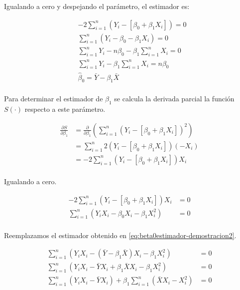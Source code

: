 \documentclass[
  11pt,
]{book}
\theoremstyle{definition}
\theoremstyle{definition}
\theoremstyle{definition}
\theoremstyle{definition}
\theoremstyle{remark}
\begin{document}
Igualando a cero y despejando el parámetro, el estimador es:

\begin{equation}
\begin{split}
&-2\sum_{i=1}^n (Y_i - [\beta_0 + \beta_1X_i]) = 0\\
&\sum_{i=1}^n (Y_i - \beta_0 - \beta_1X_i) = 0\\
&\sum_{i=1}^n Y_i - n\beta_0 - \beta_1\sum_{i=1}^nX_i = 0\\
&\sum_{i=1}^n Y_i - \beta_1\sum_{i=1}^nX_i = n\beta_0\\
&\widehat{\beta}_0 = \bar{Y} - \beta_1\bar{X} \\
\end{split}
\label{eq:beta0estimador-demostracion2}
\end{equation}

Para determinar el estimador de \(\beta_1\) se calcula la derivada parcial la función \(S(\cdot)\) respecto a este parámetro.

\begin{equation}
\begin{split}
\frac{\partial S}{\partial\beta_1} &= \frac{\partial }{\partial\beta_1}\left(\sum_{i=1}^n (Y_i - [\beta_0 + \beta_1X_i])^2\right)\\
&= \sum_{i=1}^n 2(Y_i - [\beta_0 + \beta_1X_i])(-X_i)\\
&= -2\sum_{i=1}^n (Y_i - [\beta_0 + \beta_1X_i])X_i\\
\end{split}
\label{eq:beta1estimador-demostracion1}
\end{equation}

Igualando a cero.

\begin{equation}
\begin{split}
-2\sum_{i=1}^n (Y_i - [\beta_0 + \beta_1X_i])X_i &= 0\\
\sum_{i=1}^n (Y_iX_i - \beta_0X_i - \beta_1X_i^2) &= 0\\
\end{split}
\label{eq:beta1estimador-demostracion2}
\end{equation}

Reemplazamos el estimador obtenido en \eqref{eq:beta0estimador-demostracion2}.

\begin{equation}
\begin{split}
\sum_{i=1}^n (Y_iX_i - (\bar{Y} - \beta_1\bar{X})X_i - \beta_1X_i^2) &= 0\\
\sum_{i=1}^n (Y_iX_i - \bar{Y}X_i + \beta_1\bar{X}X_i - \beta_1X_i^2) &= 0\\
\sum_{i=1}^n (Y_iX_i - \bar{Y}X_i) + \beta_1\sum_{i=1}^n(\bar{X}X_i - X_i^2) &= 0\\
\end{split}
\label{eq:beta1estimador-demostracion3}
\end{equation}
\end{document}
